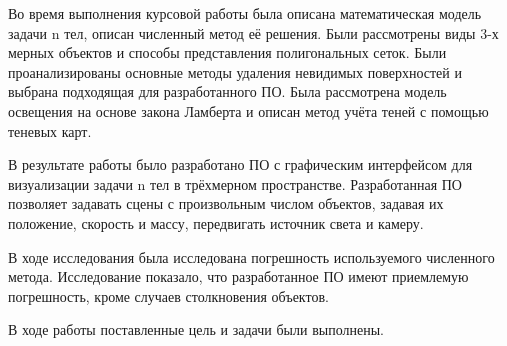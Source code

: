 
Во время выполнения курсовой работы была описана математическая модель задачи n тел, описан численный метод её решения. Были рассмотрены виды 3-х мерных объектов и способы представления полигональных сеток. Были проанализированы основные методы удаления невидимых поверхностей и выбрана подходящая для разработанного ПО. Была рассмотрена модель освещения на основе закона Ламберта и описан метод учёта теней с помощью теневых карт.

В результате работы было разработано ПО с графическим интерфейсом для визуализации задачи n тел в трёхмерном пространстве. Разработанная ПО позволяет задавать сцены с произвольным числом объектов, задавая их положение, скорость и массу, передвигать источник света и камеру.

В ходе исследования была исследована погрешность используемого численного метода. Исследование показало, что разработанное ПО имеют приемлемую погрешность, кроме случаев столкновения объектов.

В ходе работы поставленные цель и задачи были выполнены.